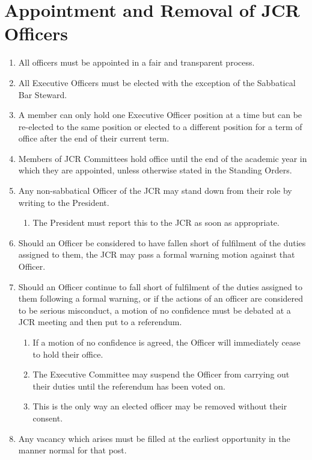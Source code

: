\documentclass[12pt]{article}
\begin{document}
\section{Appointment and Removal of JCR Officers}
\begin{enumerate}
    \item All officers must be appointed in a fair and transparent process.
    \item All Executive Officers must be elected with the exception of the Sabbatical Bar Steward.
    \item A member can only hold one Executive Officer position at a time but can be re-elected to the same position or elected to a different position for a term of office after the end of their current term.
    \item Members of JCR Committees hold office until the end of the academic year in which they are appointed, unless otherwise stated in the Standing Orders.
    \item Any non-sabbatical Officer of the JCR may stand down from their role by writing to the President.
    \begin{enumerate}
        \item The President must report this to the JCR as soon as appropriate.
    \end{enumerate}
    \item Should an Officer be considered to have fallen short of fulfilment of the duties assigned to them, the JCR may pass a formal warning motion against that Officer.
    \item Should an Officer continue to fall short of fulfilment of the duties assigned to them following a formal warning, or if the actions of an officer are considered to be serious misconduct, a motion of no confidence must be debated at a JCR meeting and then put to a referendum.
    \begin{enumerate}
        \item If a motion of no confidence is agreed, the Officer will immediately cease to hold their office.
        \item The Executive Committee may suspend the Officer from carrying out their duties until the referendum has been voted on.
        \item This is the only way an elected officer may be removed without their consent.
    \end{enumerate}
    \item Any vacancy which arises must be filled at the earliest opportunity in the manner normal for that post.

\end{enumerate}
\end{document}

